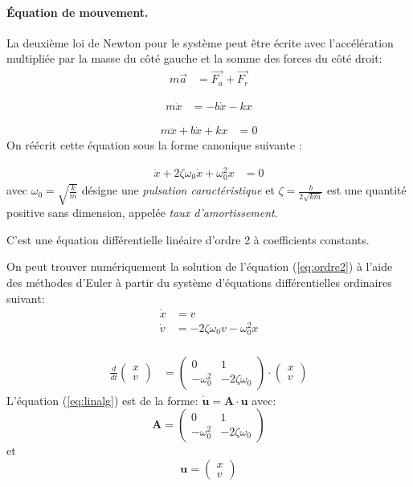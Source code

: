 \documentclass[%
oneside,                 %
final,                   %
10pt]{article}
\begin{document}
\noindent
\paragraph{Équation de mouvement.}
La deuxième loi de Newton pour le système peut être écrite avec l'accélération multipliée par la masse du côté gauche et la somme des forces du côté droit:
\begin{align}
  m \overrightarrow{a} &=  \overrightarrow{F_a} + \overrightarrow{F_r}
\end{align}

\begin{align}
  m \ddot{x} &=  - b \dot{x} - kx
\end{align}

\begin{align}
  m \ddot{x} + b \dot{x} + kx &= 0
\end{align}
On réécrit cette équation sous la forme canonique suivante :

\begin{align}
\label{eq:ordre2}
\ddot{x} + 2 \zeta \omega_0 \dot{x} + \omega_0^2 x &= 0
\end{align}
avec $\omega_0 = \sqrt{\frac{k}{m}}$ désigne une \emph{pulsation caractéristique} et $\zeta = \frac{b}{2 \sqrt{km}}$ est une quantité positive sans dimension, appelée \emph{taux d’amortissement}.

C'est une équation différentielle linéaire d'ordre 2 à coefficients constants.

On peut trouver numériquement la solution de l'équation (\ref{eq:ordre2}) à l'aide des méthodes d'Euler à partir du système d'équations différentielles ordinaires suivant:
\begin{align}
\dot{x} &= v\\
\dot{v} &= - 2 \zeta \omega_0 v - \omega_0^2 x\\
\end{align}

\label{eq:linalg}
\begin{align}
\frac{d}{dt}
\left(\begin{array}{c}
x\\
v
\end{array}\right)
&=
\left(\begin{array}{cc}
0 & 1\\
- \omega_0^2 & - 2 \zeta \omega_0
\end{array}\right) \cdot
\left(\begin{array}{c}
x\\
v
\end{array}\right)
\end{align}
L'équation (\ref{eq:linalg}) est de la forme: $\dot{\pmb{u}} = \pmb{A} \cdot \pmb{u}$ avec:
$$ \pmb{A}= \left(\begin{array}{cc}0&1\\- \omega_0^2 & - 2 \zeta \omega_0 \end{array}\right)$$ et $$\pmb{u} = \left(\begin{array}{c} x\\ v \end{array}\right)$$
\end{document}
